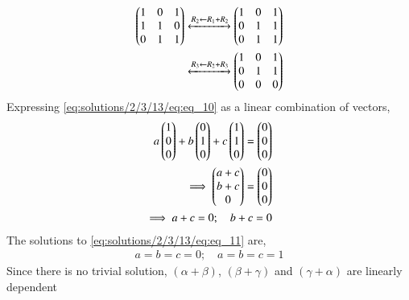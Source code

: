 \begin{align}
    \begin{pmatrix}1 & 0 & 1 \\ 1 & 1 & 0 \\ 0 & 1 & 1\end{pmatrix} \xleftrightarrow[]{R_2\leftarrow R_1+R_2} \begin{pmatrix}1 & 0 & 1 \\ 0 & 1 & 1 \\ 0 & 1 & 1 \end{pmatrix} \nonumber \\ \xleftrightarrow[]{R_3\leftarrow R_2+R_3} \begin{pmatrix}1 & 0 & 1 \\ 0 & 1 & 1 \\ 0 & 0 & 0\end{pmatrix} \label{eq:solutions/2/3/13/eq:eq_10}
\end{align}
Expressing \eqref{eq:solutions/2/3/13/eq:eq_10} as a linear combination of vectors,
\begin{align}
    a \begin{pmatrix}1 \\ 0 \\ 0\end{pmatrix} + b \begin{pmatrix}0 \\ 1 \\ 0\end{pmatrix} + c \begin{pmatrix}1 \\ 1 \\ 0\end{pmatrix} = \begin{pmatrix}0 \\ 0 \\ 0\end{pmatrix} \nonumber \\
    \implies \begin{pmatrix}a+c \\ b+c \\ 0\end{pmatrix} = \begin{pmatrix}0 \\ 0 \\ 0\end{pmatrix} \nonumber \\
    \implies a+c = 0; \quad b+c = 0 \label{eq:solutions/2/3/13/eq:eq_11}
\end{align}
The solutions to \eqref{eq:solutions/2/3/13/eq:eq_11} are,
\begin{align}
    a=b=c=0; \quad a=b=c=1
\end{align}
Since there is no trivial solution, $(\alpha + \beta)$, $(\beta + \gamma)$ and $(\gamma + \alpha)$ are linearly dependent
